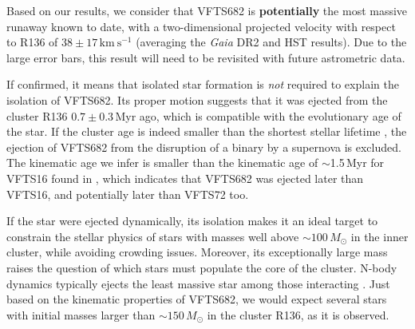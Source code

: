 \documentclass[a4paper,fleqn,usenatbib]{mnras}
\newcommand{\newtext}[1]{{\color{ForestGreen}\bf{#1}}}
\newcommand{\kms}{{\,\mathrm{km\ s^{-1}}}}
\begin{document}
Based on our results, we consider that VFTS682 is
\newtext{potentially} the most massive
runaway known to date, with a two-dimensional
projected velocity with respect to R136 of
$38\pm17\kms$ (averaging the \emph{Gaia} DR2 and HST
results). Due to the large error bars, this result will need
to be revisited with future astrometric data. %

If confirmed, it means that isolated star formation is
\emph{not} required to explain the isolation of VFTS682. Its proper motion suggests that it was ejected from the cluster R136
$0.7\pm0.3$\,Myr ago, which is compatible with the evolutionary age of
the star. If the
cluster age \citep[$\lesssim2$\,Myr,][]{crowther:10, sabbi:12} is
indeed smaller than the shortest stellar lifetime
\citep[$\sim$3\,Myr,][]{brott:11,kohler:15, zapartas:17}, the ejection of VFTS682
from the disruption of a binary by a supernova is excluded. %
The kinematic age we infer is smaller than the kinematic age of
$\sim$1.5\,Myr for VFTS16 found in \cite{lennon:18}, which indicates
that VFTS682 was ejected later than VFTS16, and potentially later than
VFTS72 too.


If the star were ejected dynamically, its isolation makes it an ideal target to constrain the stellar physics of
stars with masses well above $\sim$$100\,M_\odot$ in the inner
cluster, while avoiding
crowding issues. Moreover, 
 its exceptionally large mass raises the question of which stars must populate
the core of the cluster. N-body dynamics typically ejects the least
massive star among those interacting \cite[\newtext{although the
  dynamical ejection fraction increases with mass because of mass
  segregation}, e.g.,][]{banerjee:12}. Just
based on the kinematic properties of VFTS682, we would expect several
stars with initial masses larger than $\sim$$150\,M_\odot$ in the
cluster R136, as it is observed.%
\end{document}
